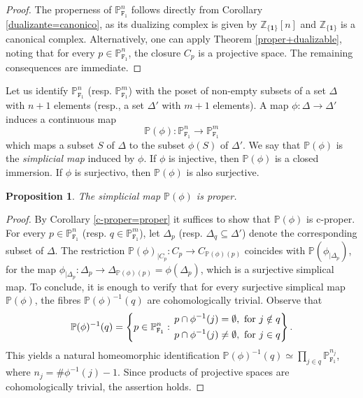 \documentclass[amssymb,amscd,11pt,20pt]{amsart}
\newcommand{\FF}{{\mathtt F}}
\newcommand{\ZZ}{{\mathbb Z}}
\newcommand{\PP}{\mathbb P}
\newcommand{\0}{\mathbf 0}
\newcommand{\un}{\mathbf 1}
\theoremstyle{plain}
\newtheorem{prop}[thm]{Proposition}
\numberwithin{equation}{thm}
\begin{document}
\begin{proof} The properness of  $\PP^n_{\FF_1}$ follows directly from Corollary \ref{dualizante=canonico}, as  its dualizing complex is given by $\ZZ_{\{\un\}}[n]$ and $\ZZ_{\{\un\}}$ is a canonical complex. Alternatively, one can apply Theorem \ref{proper+dualizable}, noting that for every $p\in\PP^n_{\FF_1}$, the closure $C_p$ is a projective space.
The remaining consequences are immediate.
\end{proof}


Let us identify $\PP^n_{\FF_1}$ (resp. $\PP^m_{\FF_1}$) with the poset of non-empty subsets of a set $\Delta$ with $n+1$ elements (resp.,  a set $\Delta'$ with $m+1$ elements). A map $\phi\colon \Delta\to\Delta'$ induces a continuous map
\[\PP(\phi)\colon \PP^n_{\FF_1}\to \PP^m_{\FF_1}\] which maps a subset $S$ of $\Delta$ to the subset $\phi(S)$ of $\Delta'$. We say that $\PP(\phi)$ is the \emph{simplicial map} induced by $\phi$. If $\phi$ is injective, then $\PP(\phi)$ is a closed immersion. If $\phi$ is surjectivo, then $\PP(\phi)$ is also surjective. 
\begin{prop}\label{linear-proper} The simplicial map $\PP(\phi)$ is proper.
\end{prop}
\begin{proof} By Corollary \ref{c-proper=proper} it suffices to show that $\PP(\phi)$ is c-proper. For every $p\in \PP^n_{\FF_1}$ (resp. $q\in \PP^m_{\FF_1}$), let  $\Delta_p$ (resp.  $\Delta_q\subseteq \Delta'$) denote the corresponding subset of $\Delta$. The restriction $\PP(\phi)_{\vert C_p}\colon C_p\to C_{\PP(\phi)(p)}$ coincides with $\PP(\phi_{\vert \Delta_p})$, for the map $\phi_{\vert \Delta_p}\colon \Delta_p\to \Delta_{\PP(\phi)(p)}=\phi(\Delta_p)$, which is a surjective simplical map. To conclude, it is enough to verify that for every surjective simplical map  $\PP(\phi)$, the fibres $\PP(\phi)^{-1}(q)$ are cohomologically trivial. Observe that
\[ \PP(\phi)^{-1}(q)=\left\{ p\in \PP^n_{\FF_1}: \,\aligned  p\cap \phi^{-1}(j)&=\emptyset,\text{ for } j\notin q
\\ p\cap \phi^{-1}(j)&\neq\emptyset,\text{ for } j\in q\endaligned\right\}.\]
This yields a natural homeomorphic identification  $\PP(\phi)^{-1}(q)\simeq \underset{j\in q}\prod \PP^{n_j}_{\FF_1}$, where $n_j=\# \phi^{-1}(j) -1$. Since products of projective spaces are cohomologically trivial, the assertion holds.
\end{proof}
\end{document}
